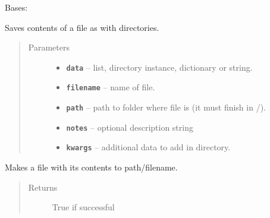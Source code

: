 \documentclass[letterpaper,10pt,english]{sphinxmanual}
\begin{document}
\begin{fulllineitems}
\label{RRtoolbox.lib:RRtoolbox.lib.directory.FileDirectory}
Bases: {\hyperref[RRtoolbox.lib:RRtoolbox.lib.directory.directory]{\emph{}}}

Saves contents of a file as with directories.
\begin{quote}\begin{description}
\item[{Parameters}] \leavevmode\begin{itemize}
\item {} 
\textbf{\texttt{data}} -- list, directory instance, dictionary or string.

\item {} 
\textbf{\texttt{filename}} -- name of file.

\item {} 
\textbf{\texttt{path}} -- path to folder where file is (it must finish in /).

\item {} 
\textbf{\texttt{notes}} -- optional description string

\item {} 
\textbf{\texttt{kwargs}} -- additional data to add in directory.

\end{itemize}

\end{description}\end{quote}

\begin{fulllineitems}
\label{RRtoolbox.lib:RRtoolbox.lib.directory.FileDirectory.makeFile}
Makes a file with its contents to path/filename.
\begin{quote}\begin{description}
\item[{Returns}] \leavevmode
True if successful

\end{description}\end{quote}

\end{fulllineitems}


\end{fulllineitems}

\end{document}

